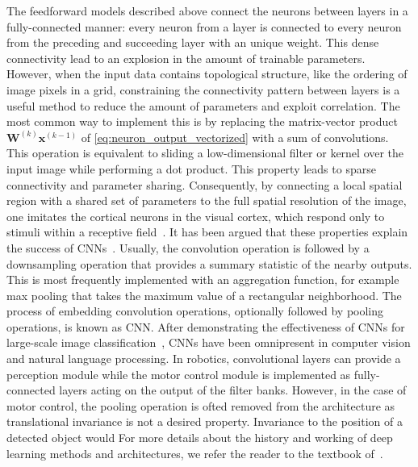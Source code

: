 \documentclass[\home/main.tex]{subfiles}
\begin{document}
The feedforward models described above connect the neurons between layers in a fully-connected manner: every neuron from a layer is connected to every neuron from the preceding and succeeding layer with an unique weight. This dense connectivity lead to an explosion in the amount of trainable parameters. However, when the input data contains topological structure, like the ordering of image pixels in a grid, constraining the connectivity pattern between layers is a useful method to reduce the amount of parameters and exploit correlation. The most common way to implement this is by replacing the matrix-vector product $\mathbf{W}^{(k)} \mathbf{x}^{(k-1)}$ of \cref{eq:neuron_output_vectorized} with a sum of convolutions. This operation is equivalent to sliding a low-dimensional filter or kernel over the input image while performing a dot product. This property leads to sparse connectivity and parameter sharing. Consequently, by connecting a local spatial region with a shared set of parameters to the full spatial resolution of the image, one imitates the cortical neurons in the visual cortex, which respond only to stimuli within a receptive field~\autocite{hubel1959receptive}. It has been argued that these properties explain the success of \glspl{CNN}~\autocite{Goodfellow2016}. Usually, the convolution operation is followed by a downsampling operation that provides a summary statistic of the nearby outputs. This is most frequently implemented with an aggregation function, for example max pooling that takes the maximum value of a rectangular neighborhood. The process of embedding convolution operations, optionally followed by pooling operations, is known as \gls{CNN}. After demonstrating the effectiveness of \glspl{CNN} for large-scale image classification~\autocite{Krizhevsky2012}, \glspl{CNN} have been omnipresent in computer vision and natural language processing. In robotics, convolutional layers can provide a perception module while the motor control module is implemented as fully-connected layers acting on the output of the filter banks. However, in the case of motor control, the pooling operation is ofted removed from the architecture as translational invariance is not a desired property. Invariance to the position of a detected object would  For more details about the history and working of deep learning methods and architectures, we refer the reader to the textbook of~\textcite{Goodfellow2016}.
\end{document}
